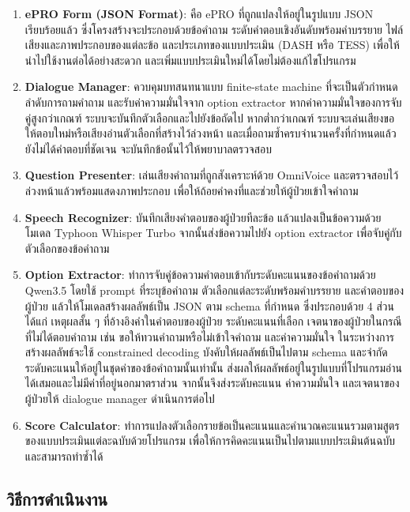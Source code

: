 \begin{enumerate}
    \item \textbf{ePRO Form (JSON Format)}: คือ ePRO ที่ถูกแปลงให้อยู่ในรูปแบบ JSON เรียบร้อยแล้ว ซึ่งโครงสร้างจะประกอบด้วยข้อคำถาม 
    ระดับคำตอบเชิงอันดับพร้อมคำบรรยาย ไฟล์เสียงและภาพประกอบของแต่ละข้อ และประเภทของแบบประเมิน (DASH หรือ TESS)
    เพื่อให้นำไปใช้งานต่อได้อย่างสะดวก และเพิ่มแบบประเมินใหม่ได้โดยไม่ต้องแก้ไขโปรแกรม
    \item \textbf{Dialogue Manager}: ควบคุมบทสนทนาแบบ finite-state machine 
    ที่จะเป็นตัวกำหนดลำดับการถามคำถาม และรับค่าความมั่นใจจาก option extractor
    หากค่าความมั่นใจของการจับคู่สูงกว่าเกณฑ์ ระบบจะบันทึกตัวเลือกและไปยังข้อถัดไป
    หากต่ำกว่าเกณฑ์ ระบบจะเล่นเสียงขอให้ตอบใหม่หรือเสียงอ่านตัวเลือกที่สร้างไว้ล่วงหน้า
    และเมื่อถามซ้ำครบจำนวนครั้งที่กำหนดแล้วยังไม่ได้คำตอบที่ชัดเจน จะบันทึกข้อนั้นไว้ให้พยาบาลตรวจสอบ
    \item \textbf{Question Presenter}: เล่นเสียงคำถามที่ถูกสังเคราะห์ด้วย OmniVoice \citep{Zhu2026OmniVoice} และตรวจสอบไว้ล่วงหน้าแล้วพร้อมแสดงภาพประกอบ เพื่อให้ถ้อยคำคงที่และช่วยให้ผู้ป่วยเข้าใจคำถาม
    \item \textbf{Speech Recognizer}: บันทึกเสียงคำตอบของผู้ป่วยทีละข้อ แล้วแปลงเป็นข้อความด้วยโมเดล Typhoon Whisper Turbo 
    จากนั้นส่งข้อความไปยัง option extractor เพื่อจับคู่กับตัวเลือกของข้อคำถาม
    \item \textbf{Option Extractor}: ทำการจับคู่ข้อความคำตอบเข้ากับระดับคะแนนของข้อคำถามด้วย Qwen3.5 โดยใช้
    prompt ที่ระบุข้อคำถาม ตัวเลือกแต่ละระดับพร้อมคำบรรยาย และคำตอบของผู้ป่วย
    แล้วให้โมเดลสร้างผลลัพธ์เป็น JSON ตาม schema ที่กำหนด ซึ่งประกอบด้วย 4 ส่วน ได้แก่
    เหตุผลสั้น ๆ ที่อ้างอิงคำในคำตอบของผู้ป่วย ระดับคะแนนที่เลือก
    เจตนาของผู้ป่วยในกรณีที่ไม่ได้ตอบคำถาม เช่น ขอให้ทวนคำถามหรือไม่เข้าใจคำถาม และค่าความมั่นใจ
    ในระหว่างการสร้างผลลัพธ์จะใช้ constrained decoding บังคับให้ผลลัพธ์เป็นไปตาม schema
    และจำกัดระดับคะแนนให้อยู่ในชุดค่าของข้อคำถามนั้นเท่านั้น ส่งผลให้ผลลัพธ์อยู่ในรูปแบบที่โปรแกรมอ่านได้เสมอและไม่มีค่าที่อยู่นอกมาตราส่วน
    จากนั้นจึงส่งระดับคะแนน ค่าความมั่นใจ และเจตนาของผู้ป่วยให้ dialogue manager ดำเนินการต่อไป
    \item \textbf{Score Calculator}: ทำการแปลงตัวเลือกรายข้อเป็นคะแนนและคำนวณคะแนนรวมตามสูตรของแบบประเมินแต่ละฉบับด้วยโปรแกรม
    เพื่อให้การคิดคะแนนเป็นไปตามแบบประเมินต้นฉบับและสามารถทำซ้ำได้
\end{enumerate}

\subsection{วิธีการดำเนินงาน}

